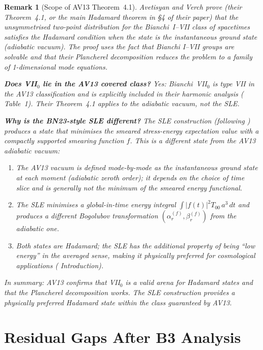 \documentclass[12pt, a4paper]{article}
\newtheorem{remark}[theorem]{Remark}
\theoremstyle{remark}
\begin{document}
\begin{remark}[Scope of AV13 Theorem~4.1]\label{rem:AV13-scope}
  Avetisyan and Verch \cite{AV13} prove (their Theorem~4.1, or the
  main Hadamard theorem in §4 of their paper) that the \emph{unsymmetrised
  two-point distribution} for the Bianchi~I--VII class of spacetimes
  satisfies the Hadamard condition when the state is the instantaneous
  ground state (adiabatic vacuum).
  The proof uses the fact that Bianchi I--VII groups are solvable and
  that their Plancherel decomposition reduces the problem to a family of
  1-dimensional mode equations.

  \textbf{Does VII$_0$ lie in the AV13 covered class?}
  Yes: Bianchi~VII$_0$ is type VII in the AV13 classification and is
  explicitly included in their harmonic analysis (\cite{AV13} Table~1).
  Their Theorem~4.1 applies to the \emph{adiabatic vacuum}, not the SLE.

  \textbf{Why is the BN23-style SLE different?}
  The SLE construction (following \cite{Olb07,TB13,BN23}) produces a
  state that minimises the smeared stress-energy expectation value with
  a compactly supported smearing function $f$.  This is a different
  state from the AV13 adiabatic vacuum:
  \begin{enumerate}
    \item The AV13 vacuum is defined mode-by-mode as the instantaneous
      ground state at each moment (adiabatic zeroth order); it depends on
      the choice of time slice and is generally \emph{not} the minimum
      of the smeared energy functional.
    \item The SLE minimises a global-in-time energy integral
      $\int |f(t)|^2 T_{00}\,a^3\,dt$ and produces a different
      Bogolubov transformation $(\alpha_r^{(f)}, \beta_r^{(f)})$
      from the adiabatic one.
    \item Both states are Hadamard; the SLE has the additional property
      of being ``low energy'' in the averaged sense, making it
      physically preferred for cosmological applications
      (\cite{BN23} Introduction).
  \end{enumerate}
  In summary: AV13 confirms that VII$_0$ is a valid arena for Hadamard
  states and that the Plancherel decomposition works.  The SLE
  construction provides a physically preferred Hadamard state within
  the class guaranteed by AV13.
\end{remark}

\section{Residual Gaps After B3 Analysis}
\label{sec:residual-gaps}
\end{document}
